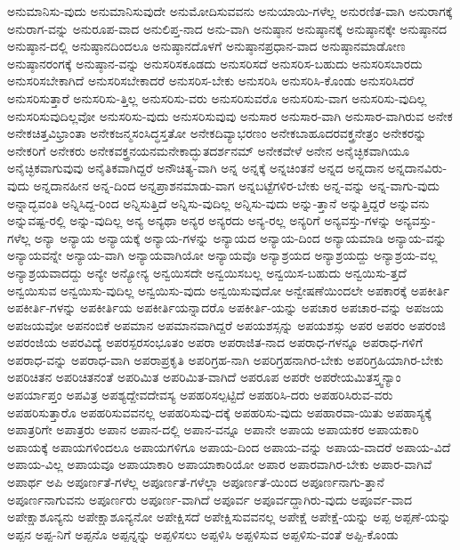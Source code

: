 {ಅನುಮಾನಿಸು-ವುದು
ಅನುಮಾನಿಸುವುದೇ
ಅನುಮೋದಿಸುವವನು
ಅನುಯಾಯಿ-ಗಳೆಲ್ಲ
ಅನುರಣಿತ-ವಾಗಿ
ಅನುರಾಗಕ್ಕೆ
ಅನುರಾಗ-ವನ್ನು
ಅನುರೂಪ-ವಾದ
ಅನುಲಿಪ್ತ-ನಾದ
ಅನು-ವಾಗಿ
ಅನುಷ್ಠಾನ
ಅನುಷ್ಠಾನಕ್ಕೆ
ಅನುಷ್ಠಾನಕ್ಕೇ
ಅನುಷ್ಠಾನದ
ಅನುಷ್ಠಾನ-ದಲ್ಲಿ
ಅನುಷ್ಠಾನದಿಂದಲೂ
ಅನುಷ್ಠಾನದೊಳಗೆ
ಅನುಷ್ಠಾನಪ್ರಧಾನ-ವಾದ
ಅನುಷ್ಠಾನಮಾಡೋಣ
ಅನುಷ್ಠಾನರಂಗಕ್ಕೆ
ಅನುಷ್ಠಾನ-ವನ್ನು
ಅನುಸರಿಸಕೂಡದು
ಅನುಸರಿಸದೆ
ಅನುಸರಿಸ-ಬಹುದು
ಅನುಸರಿಸಬಾರದು
ಅನುಸರಿಸಬೇಕಾಗಿದೆ
ಅನುಸರಿಸಬೇಕಾದರೆ
ಅನುಸರಿಸ-ಬೇಕು
ಅನುಸರಿಸಿ
ಅನುಸರಿಸಿ-ಕೊಂಡು
ಅನುಸರಿಸಿದರೆ
ಅನುಸರಿಸುತ್ತಾರೆ
ಅನುಸರಿಸು-ತ್ತಿಲ್ಲ
ಅನುಸರಿಸು-ವರು
ಅನುಸರಿಸುವರೊ
ಅನುಸರಿಸು-ವಾಗ
ಅನುಸರಿಸು-ವುದಿಲ್ಲ
ಅನುಸರಿಸುವುದಿಲ್ಲವೋ
ಅನುಸರಿಸು-ವುದು
ಅನುಸರಿಸುವುವು
ಅನುಸಾರ
ಅನುಸಾರ-ವಾಗಿ
ಅನುಸಾರ-ವಾಗಿರುವ
ಅನೇಕ
ಅನೇಕಚಿತ್ತವಿಭ್ರಾಂತಾ
ಅನೇಕಜನ್ಮಸಂಸಿದ್ಧಸ್ತತೋ
ಅನೇಕದಿವ್ಯಾಭರಣಂ
ಅನೇಕಬಾಹೂದರವಕ್ತ್ರನೇತ್ರಂ
ಅನೇಕರನ್ನು
ಅನೇಕರಿಗೆ
ಅನೇಕರು
ಅನೇಕವಕ್ತ್ರನಯನಮನೇಕಾದ್ಭುತದರ್ಶನಮ್
ಅನೇಕವೇಳೆ
ಅನೇನ
ಅನೈಚ್ಛಿಕವಾಗಿಯೂ
ಅನೈಚ್ಛಿಕವಾಗುವುವು
ಅನೈತಿಕವಾಗಿದ್ದರೆ
ಅನೌಚಿತ್ಯ-ವಾಗಿ
ಅನ್ನ
ಅನ್ನಕ್ಕೆ
ಅನ್ನಚಿಂತನೆ
ಅನ್ನದ
ಅನ್ನದಾನ
ಅನ್ನದಾನವಿರು-ವುದು
ಅನ್ನದಾನಹೀನ
ಅನ್ನ-ದಿಂದ
ಅನ್ನಪ್ರಾಶನಮಾಡು-ವಾಗ
ಅನ್ನಬಟ್ಟೆಗಳಿರ-ಬೇಕು
ಅನ್ನ-ವನ್ನು
ಅನ್ನ-ವಾಗು-ವುದು
ಅನ್ನಾದ್ಭವಂತಿ
ಅನ್ನಿಸಿದ್ದ-ರಿಂದ
ಅನ್ನಿಸುತ್ತಿದೆ
ಅನ್ನಿಸು-ವುದಿಲ್ಲ
ಅನ್ನಿಸು-ವುದು
ಅನ್ನು-ತ್ತಾನೆ
ಅನ್ನುತ್ತಿದ್ದರೆ
ಅನ್ನುವನು
ಅನ್ನುವಷ್ಟ-ರಲ್ಲಿ
ಅನ್ನು-ವುದಿಲ್ಲ
ಅನ್ಯ
ಅನ್ಯಥಾ
ಅನ್ಯರ
ಅನ್ಯರದು
ಅನ್ಯ-ರಲ್ಲ
ಅನ್ಯರಿಗೆ
ಅನ್ಯವಸ್ತು-ಗಳನ್ನು
ಅನ್ಯವಸ್ತು-ಗಳೆಲ್ಲ
ಅನ್ಯಾ
ಅನ್ಯಾಯ
ಅನ್ಯಾಯಕ್ಕೆ
ಅನ್ಯಾಯ-ಗಳನ್ನು
ಅನ್ಯಾಯದ
ಅನ್ಯಾಯ-ದಿಂದ
ಅನ್ಯಾಯಮಾಡಿ
ಅನ್ಯಾಯ-ವನ್ನು
ಅನ್ಯಾಯವನ್ನೇ
ಅನ್ಯಾಯ-ವಾಗಿ
ಅನ್ಯಾಯವಾಗಿಯೋ
ಅನ್ಯಾಯವೊ
ಅನ್ಯಾಶ್ರಯದ
ಅನ್ಯಾಶ್ರಯದ್ದು
ಅನ್ಯಾಶ್ರಯ-ವಲ್ಲ
ಅನ್ಯಾಶ್ರಯವಾದದ್ದು
ಅನ್ಯೇ
ಅನ್ಯೋನ್ಯ
ಅನ್ವಯಿಸದೇ
ಅನ್ವಯಿಸಬಲ್ಲ
ಅನ್ವಯಿಸ-ಬಹುದು
ಅನ್ವಯಿಸು-ತ್ತದೆ
ಅನ್ವಯಿಸುವ
ಅನ್ವಯಿಸು-ವುದಿಲ್ಲ
ಅನ್ವಯಿಸು-ವುದು
ಅನ್ವಯಿಸುವುದೋ
ಅನ್ವೇಷಣೆಯಿಂದಲೇ
ಅಪಕಾರಕ್ಕೆ
ಅಪಕೀರ್ತಿ
ಅಪಕೀರ್ತಿ-ಗಳನ್ನು
ಅಪಕೀರ್ತಿಯ
ಅಪಕೀರ್ತಿಯನ್ನಾದರೊ
ಅಪಕೀರ್ತಿ-ಯನ್ನು
ಅಪಚಾರ
ಅಪಚಾರ-ವನ್ನು
ಅಪಜಯ
ಅಪಜಯವೋ
ಅಪನಂಬಿಕೆ
ಅಪಮಾನ
ಅಪಮಾನವಾಗಿದ್ದರೆ
ಅಪಯಶಸ್ಸನ್ನು
ಅಪಯಶಸ್ಸು
ಅಪರ
ಅಪರಂ
ಅಪರಂಜಿ
ಅಪರಂಜಿಯ
ಅಪರವಿದ್ಯೆ
ಅಪರಸ್ಪರಸಂಭೂತಂ
ಅಪರಾ
ಅಪರಾಜಿತ-ನಾದ
ಅಪರಾಧ-ಗಳನ್ನೂ
ಅಪರಾಧ-ಗಳಿಗೆ
ಅಪರಾಧ-ವನ್ನು
ಅಪರಾಧ-ವಾಗಿ
ಅಪರಾಪ್ರಕೃತಿ
ಅಪರಿಗ್ರಹ-ನಾಗಿ
ಅಪರಿಗ್ರಹನಾಗಿರ-ಬೇಕು
ಅಪರಿಗ್ರಹಿಯಾಗಿರ-ಬೇಕು
ಅಪರಿಚಿತನ
ಅಪರಿಚಿತನಂತೆ
ಅಪರಿಮಿತ
ಅಪರಿಮಿತ-ವಾಗಿದೆ
ಅಪರೂಪ
ಅಪರೇ
ಅಪರೇಯಮಿತಸ್ತ್ವನ್ಯಾಂ
ಅಪರ್ಯಾಪ್ತಂ
ಅಪವಿತ್ರ
ಅಪಶ್ಯದ್ದೇವದೇವಸ್ಯ
ಅಪಹರಿಸಲ್ಪಟ್ಟಿದೆ
ಅಪಹರಿಸಿ-ದರು
ಅಪಹರಿಸಿರುವ-ವರು
ಅಪಹರಿಸುತ್ತಾರೊ
ಅಪಹರಿಸುವವನಲ್ಲ
ಅಪಹರಿಸುವು-ದಕ್ಕೆ
ಅಪಹರಿಸು-ವುದು
ಅಪಹಾರವಾ-ಯಿತು
ಅಪಹಾಸ್ಯಕ್ಕೆ
ಅಪಾತ್ರರಿಗೇ
ಅಪಾತ್ರರು
ಅಪಾನ
ಅಪಾನ-ದಲ್ಲಿ
ಅಪಾನ-ವನ್ನೂ
ಅಪಾನೇ
ಅಪಾಯ
ಅಪಾಯಕರ
ಅಪಾಯಕಾರಿ
ಅಪಾಯಕ್ಕೆ
ಅಪಾಯಗಳಿಂದಲೂ
ಅಪಾಯಗಳಿಗೂ
ಅಪಾಯ-ದಿಂದ
ಅಪಾಯ-ವನ್ನು
ಅಪಾಯ-ವಾದರೆ
ಅಪಾಯ-ವಿದೆ
ಅಪಾಯ-ವಿಲ್ಲ
ಅಪಾಯವೂ
ಅಪಾಯಾಕಾರಿ
ಅಪಾಯಾಕಾರಿಯೋ
ಅಪಾರ
ಅಪಾರವಾಗಿರ-ಬೇಕು
ಅಪಾರ-ವಾಗಿವೆ
ಅಪಾರ್ಥ
ಅಪಿ
ಅಪೂರ್ಣತೆ-ಗಳೆಲ್ಲ
ಅಪೂರ್ಣತೆ-ಗಳೆಲ್ಲಾ
ಅಪೂರ್ಣತೆ-ಯಿಂದ
ಅಪೂರ್ಣನಾಗು-ತ್ತಾನೆ
ಅಪೂರ್ಣನಾಗುವನು
ಅಪೂರ್ಣರು
ಅಪೂರ್ಣ-ವಾಗಿದೆ
ಅಪೂರ್ವ
ಅಪೂರ್ವದ್ದಾಗಿರು-ವುದು
ಅಪೂರ್ವ-ವಾದ
ಅಪೇಕ್ಷಾಶೂನ್ಯನು
ಅಪೇಕ್ಷಾಶೂನ್ಯನೋ
ಅಪೇಕ್ಷಿಸದೆ
ಅಪೇಕ್ಷಿಸುವವನಲ್ಲ
ಅಪೇಕ್ಷೆ
ಅಪೇಕ್ಷೆ-ಯನ್ನು
ಅಪ್ಪ
ಅಪ್ಪಣೆ-ಯನ್ನು
ಅಪ್ಪನ
ಅಪ್ಪ-ನಿಗೆ
ಅಪ್ಪನೊ
ಅಪ್ಪನ್ನನ್ನು
ಅಪ್ಪಳಿಸಲು
ಅಪ್ಪಳಿಸಿ
ಅಪ್ಪಳಿಸುವ
ಅಪ್ಪಳಿಸು-ವಂತೆ
ಅಪ್ಪಿ-ಕೊಂಡು
}
